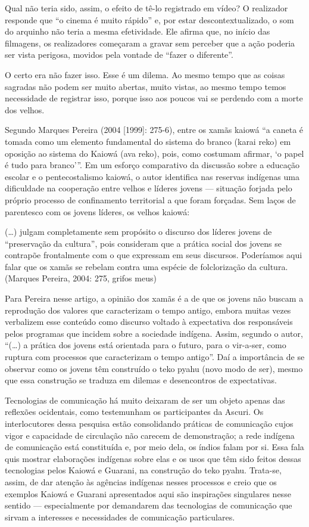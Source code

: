 Qual não teria sido, assim, o efeito de tê-lo registrado em vídeo? O
realizador responde que ``o cinema é muito rápido'' e, por estar
descontextualizado, o som do arquinho não teria a mesma efetividade.
Ele afirma que, no início das filmagens, os realizadores começaram a
gravar sem perceber que a ação poderia ser vista perigosa, movidos pela
vontade de ``fazer o diferente''.

O certo era não fazer isso. Esse é um dilema. Ao mesmo tempo que as
coisas sagradas não podem ser muito abertas, muito vistas, ao mesmo
tempo temos necessidade de registrar isso, porque isso aos poucos vai
se perdendo com a morte dos velhos.

Segundo Marques Pereira (2004 [1999]: 275-6), entre os xamãs kaiowá ``a
caneta é tomada como um elemento fundamental do sistema do branco
(karai reko) em oposição ao sistema do Kaiowá (ava reko), pois, como
costumam afirmar, ‘o papel é tudo para branco’''. Em um esforço
comparativo da discussão sobre a educação escolar e o pentecostalismo
kaiowá, o autor identifica nas reservas indígenas uma dificuldade na
cooperação entre velhos e líderes jovens — situação forjada pelo
próprio processo de confinamento territorial a que foram forçadas. Sem
laços de parentesco com os jovens líderes, os velhos kaiowá:

(\ldots{}) julgam completamente sem propósito o discurso dos líderes jovens
de ``preservação da cultura'', pois
consideram que a prática social dos jovens se contrapõe frontalmente
com o que expressam em seus discursos. Poderíamos aqui falar que os
xamãs se rebelam contra uma espécie de folclorização da cultura.
(Marques Pereira, 2004:  275, grifos meus)

Para Pereira nesse artigo, a opinião dos xamãs é a de que os jovens não
buscam a reprodução dos valores que caracterizam o tempo antigo, embora
muitas vezes verbalizem esse conteúdo como discurso voltado à
expectativa dos responsáveis pelos programas que incidem sobre a
sociedade indígena. Assim, segundo o autor, ``(\ldots{}) a prática dos jovens
está orientada para o futuro, para o vir-a-ser, como ruptura com
processos que caracterizam o tempo antigo''. Daí a importância de se
observar como os jovens têm construído o teko pyahu (novo modo de ser),
mesmo que essa construção se traduza em dilemas e desencontros de
expectativas.

Tecnologias de comunicação há muito deixaram de ser um objeto apenas das
reflexões ocidentais, como testemunham os participantes da Ascuri. Os
interlocutores dessa pesquisa estão consolidando práticas de
comunicação cujos vigor e capacidade de circulação não carecem de
demonstração; a rede indígena de comunicação está constituída e, por
meio dela, os índios falam por si. Essa fala quis mostrar elaborações
indígenas sobre elas e os usos que têm sido feitos dessas tecnologias
pelos Kaiowá e Guarani, na construção do teko pyahu. Trata-se, assim,
de dar atenção às agências indígenas nesses processos e creio que os
exemplos Kaiowá e Guarani apresentados aqui são inspirações singulares
nesse sentido — especialmente por demandarem das tecnologias de
comunicação que sirvam a interesses e necessidades de comunicação
particulares. 

